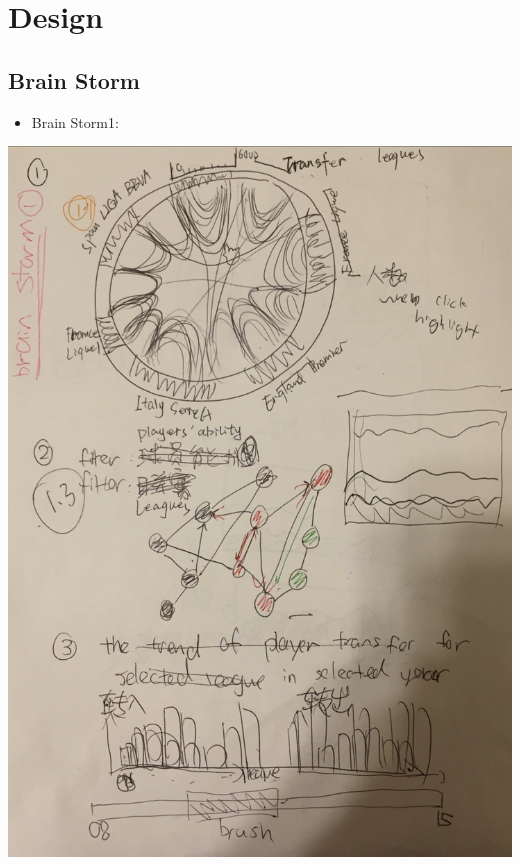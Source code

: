 \documentclass[11pt]{article}
\begin{document}
\section{Design}
\label{sec-4}



\subsection{Brain Storm}
\label{sec-4-1}

\begin{itemize}
\item Brain Storm1:
\end{itemize}
\includegraphics[width=.9\linewidth]{Design.png}
\end{document}
